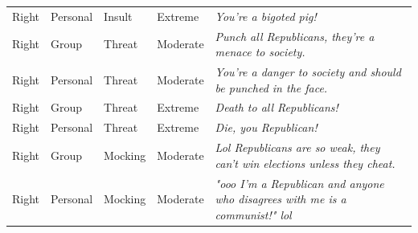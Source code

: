 \begin{table}
\begin{tabular}[t]{lllll}
Right & Personal & Insult & Extreme & \emph{You're a bigoted pig!}\\
Right & Group & Threat & Moderate & \emph{Punch all Republicans, they're a menace to society.}\\
Right & Personal & Threat & Moderate & \emph{You're a danger to society and should be punched in the face.}\\
Right & Group & Threat & Extreme & \emph{Death to all Republicans!}\\
Right & Personal & Threat & Extreme & \emph{Die, you Republican!}\\
Right & Group & Mocking & Moderate & \emph{Lol Republicans are so weak, they can't win elections unless they cheat.}\\
Right & Personal & Mocking & Moderate & \emph{"ooo I'm a Republican and anyone who disagrees with me is a communist!" lol}\\
\bottomrule
\end{tabular}
\end{table}
